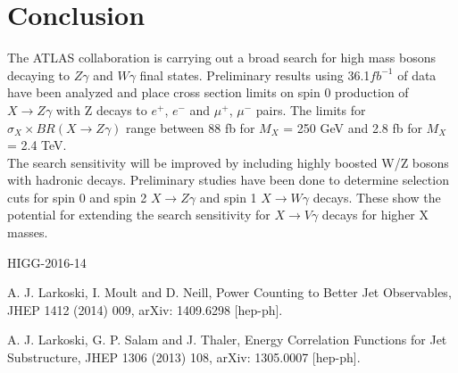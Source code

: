 \documentclass[12pt]{article}
\begin{document}
\section{Conclusion}
The ATLAS collaboration is carrying out a broad search for high mass bosons decaying to $Z\gamma$  and $W\gamma$ final states. Preliminary results using 36.1$fb^{-1}$ of data have been analyzed and place cross section limits on spin 0 production of $X\rightarrow Z\gamma$ with Z decays to $e^+$, $e^-$ and $\mu^+$, $\mu^-$ pairs. The limits for $\sigma_X\times BR(X\rightarrow Z\gamma)$ range between 88 fb for $M_X$ = 250 GeV and 2.8 fb for $M_X$ = 2.4 TeV.\\
The search sensitivity will be improved by including highly boosted W/Z bosons with hadronic decays. Preliminary studies have been done to determine selection cuts for spin 0 and spin 2 $X\rightarrow Z\gamma$  and spin 1 $X\rightarrow W\gamma$ decays. These show the potential for extending the search sensitivity for $X\rightarrow V\gamma$  decays for higher X masses.
\begin{thebibliography}{99}


HIGG-2016-14

A. J. Larkoski, I. Moult and D. Neill, Power Counting to Better Jet Observables, JHEP 1412 (2014) 009, arXiv: 1409.6298 [hep-ph].

A. J. Larkoski, G. P. Salam and J. Thaler, Energy Correlation Functions for Jet Substructure, JHEP 1306 (2013) 108, arXiv: 1305.0007 [hep-ph].


\end{thebibliography}
 
\end{document}

